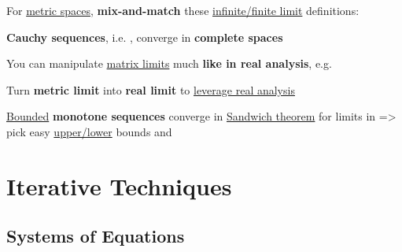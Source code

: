 \hSep %

For \ul{metric spaces}, \textbf{mix-and-match} these \ul{infinite/finite limit}
definitions:
\begin{itemize}
      \vItem
      \vItem
      \vItem
            \textbf{Cauchy sequences},
            i.e. ,
            converge in \textbf{complete spaces}
\end{itemize}
You can manipulate \ul{matrix limits} much \textbf{like in real analysis},
e.g. 

\hSep %

Turn \textbf{metric limit}  into \textbf{real limit}
 to \ul{leverage real analysis}
\begin{itemize}
      \vItem
            \ul{Bounded} \textbf{monotone sequences} converge in 
      \vItem
            \ul{Sandwich theorem} for limits in  =>
            pick easy \ul{upper/lower} bounds
      \vItem
             and
\end{itemize}

\section*{Iterative Techniques}

\subsection*{Systems of Equations}

